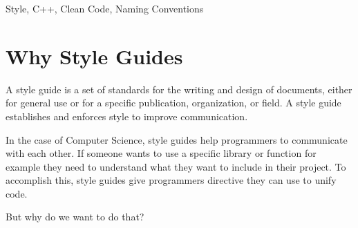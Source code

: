%
%
%
%
%
%
%

\begin{keywords}
Style, C++, Clean Code, Naming Conventions
\end{keywords}

\section{Why Style Guides} \label{sec:Introduction}%



A style guide is a set of standards for the writing and design of documents, either for general use or for a specific publication, organization, or field. A style guide establishes and enforces style to improve communication.

In the case of Computer Science, style guides help programmers to communicate with each other. If someone wants to use a specific library or function for example they need to understand what they want to include in their project. To accomplish this, style guides give programmers directive they can use to unify code.

But why do we want to do that? 

